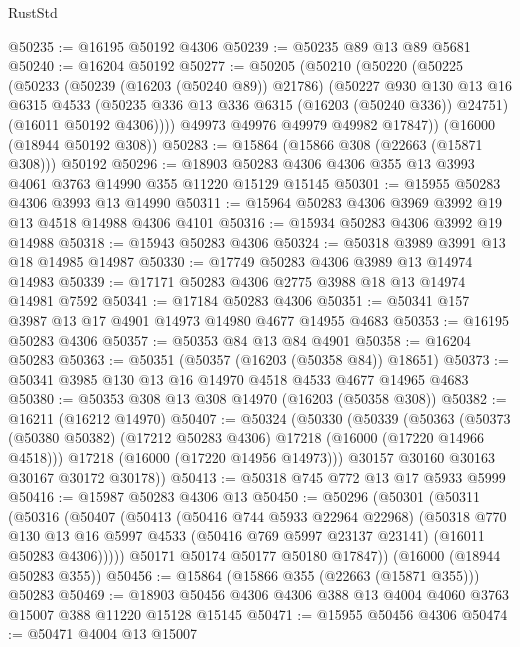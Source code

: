 \begin{lexlean}{RustStd}
\begin{coremodule}
@50235 := @16195 @50192 @4306
@50239 := @50235 @89 @13 @89 @5681
@50240 := @16204 @50192
@50277 := @50205
    (@50210
      (@50220
        (@50225
          (@50233
            (@50239 (@16203 (@50240 @89)) @21786)
            (@50227
              @930
              @130
              @13
              @16
              @6315
              @4533
              (@50235 @336 @13 @336 @6315 (@16203 (@50240 @336)) @24751)
              (@16011 @50192 @4306))))
        @49973
        @49976
        @49979
        @49982
        @17847))
    (@16000 (@18944 @50192 @308))
@50283 := @15864 (@15866 @308 (@22663 (@15871 @308))) @50192
@50296 := @18903 @50283 @4306 @4306 @355 @13 @3993 @4061 @3763 @14990 @355 @11220 @15129 @15145
@50301 := @15955 @50283 @4306 @3993 @13 @14990
@50311 := @15964 @50283 @4306 @3969 @3992 @19 @13 @4518 @14988 @4306 @4101
@50316 := @15934 @50283 @4306 @3992 @19 @14988
@50318 := @15943 @50283 @4306
@50324 := @50318 @3989 @3991 @13 @18 @14985 @14987
@50330 := @17749 @50283 @4306 @3989 @13 @14974 @14983
@50339 := @17171 @50283 @4306 @2775 @3988 @18 @13 @14974 @14981 @7592
@50341 := @17184 @50283 @4306
@50351 := @50341 @157 @3987 @13 @17 @4901 @14973 @14980 @4677 @14955 @4683
@50353 := @16195 @50283 @4306
@50357 := @50353 @84 @13 @84 @4901
@50358 := @16204 @50283
@50363 := @50351 (@50357 (@16203 (@50358 @84)) @18651)
@50373 := @50341 @3985 @130 @13 @16 @14970 @4518 @4533 @4677 @14965 @4683
@50380 := @50353 @308 @13 @308 @14970 (@16203 (@50358 @308))
@50382 := @16211 (@16212 @14970)
@50407 := @50324
    (@50330
      (@50339
        (@50363
          (@50373 (@50380 @50382) (@17212 @50283 @4306) @17218 (@16000 (@17220 @14966 @4518)))
          @17218
          (@16000 (@17220 @14956 @14973)))
        @30157
        @30160
        @30163
        @30167
        @30172
        @30178))
@50413 := @50318 @745 @772 @13 @17 @5933 @5999
@50416 := @15987 @50283 @4306 @13
@50450 := @50296
    (@50301
      (@50311
        (@50316
          (@50407
            (@50413
              (@50416 @744 @5933 @22964 @22968)
              (@50318
                @770
                @130
                @13
                @16
                @5997
                @4533
                (@50416 @769 @5997 @23137 @23141)
                (@16011 @50283 @4306)))))
        @50171
        @50174
        @50177
        @50180
        @17847))
    (@16000 (@18944 @50283 @355))
@50456 := @15864 (@15866 @355 (@22663 (@15871 @355))) @50283
@50469 := @18903 @50456 @4306 @4306 @388 @13 @4004 @4060 @3763 @15007 @388 @11220 @15128 @15145
@50471 := @15955 @50456 @4306
@50474 := @50471 @4004 @13 @15007

\end{coremodule}
\end{lexlean}
